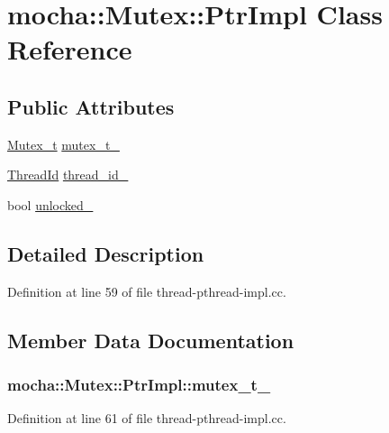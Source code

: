\hypertarget{classmocha_1_1_mutex_1_1_ptr_impl}{
\section{mocha::Mutex::PtrImpl Class Reference}
\label{classmocha_1_1_mutex_1_1_ptr_impl}
}
\subsection*{Public Attributes}
\begin{DoxyCompactItemize}
\item 
\hyperlink{namespacemocha_a7d7ee3c4481d1e56611227f6d0f64c9e}{Mutex\_\-t} \hyperlink{classmocha_1_1_mutex_1_1_ptr_impl_a95bc7de28698b08fa8f49e980764cadf}{mutex\_\-t\_\-}
\item 
\hyperlink{namespacemocha_a9fcf48a10671a66cd922f7e21d6efb6b}{ThreadId} \hyperlink{classmocha_1_1_mutex_1_1_ptr_impl_a40123271470e3e66cf3e55e40f27f685}{thread\_\-id\_\-}
\item 
bool \hyperlink{classmocha_1_1_mutex_1_1_ptr_impl_aad4220d1849efd1a2b31a67f959bfe02}{unlocked\_\-}
\end{DoxyCompactItemize}


\subsection{Detailed Description}


Definition at line 59 of file thread-\/pthread-\/impl.cc.



\subsection{Member Data Documentation}
\hypertarget{classmocha_1_1_mutex_1_1_ptr_impl_a95bc7de28698b08fa8f49e980764cadf}{
\subsubsection[{mutex\_\-t\_\-}]{ {\bf mocha::Mutex::PtrImpl::mutex\_\-t\_\-}}}
\label{classmocha_1_1_mutex_1_1_ptr_impl_a95bc7de28698b08fa8f49e980764cadf}


Definition at line 61 of file thread-\/pthread-\/impl.cc.

